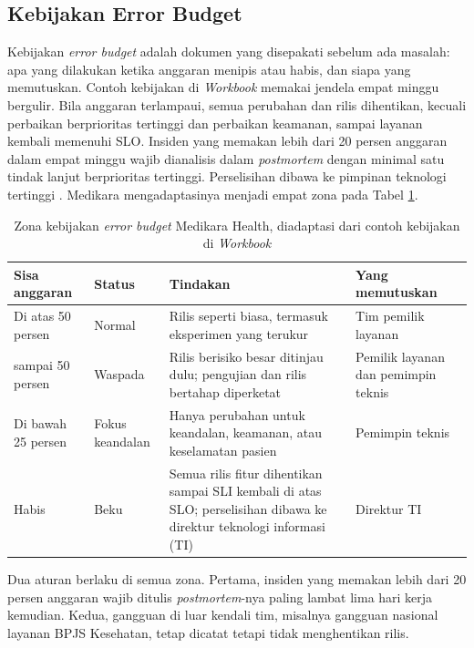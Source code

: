 \subsection{Kebijakan Error Budget}

Kebijakan \textit{error budget} adalah dokumen yang disepakati sebelum ada masalah: apa yang
dilakukan ketika anggaran menipis atau habis, dan siapa yang memutuskan. Contoh kebijakan di
\textit{Workbook} memakai jendela empat minggu bergulir. Bila anggaran terlampaui, semua perubahan
dan rilis dihentikan, kecuali perbaikan berprioritas tertinggi dan perbaikan keamanan, sampai
layanan kembali memenuhi SLO. Insiden yang memakan lebih dari 20 persen anggaran dalam empat minggu
wajib dianalisis dalam \textit{postmortem} dengan minimal satu tindak lanjut berprioritas
tertinggi. Perselisihan dibawa ke pimpinan teknologi tertinggi \cite{c11-sre-workbook}. Medikara
mengadaptasinya menjadi empat zona pada Tabel \ref{tab:ch11-kebijakan-error-budget}.

\begin{table}[!htb]
  \centering
  \caption{Zona kebijakan \textit{error budget} Medikara Health, diadaptasi dari contoh kebijakan
           di \textit{Workbook}}
  \label{tab:ch11-kebijakan-error-budget}
  \footnotesize
  \begin{tabularx}{\textwidth}{>{\raggedright\arraybackslash}p{2.2cm} >{\raggedright\arraybackslash}p{1.8cm} >{\raggedright\arraybackslash}X >{\raggedright\arraybackslash}p{2.4cm}}
    \hline
    \textbf{Sisa anggaran} & \textbf{Status} & \textbf{Tindakan} & \textbf{Yang memutuskan} \\ \hline
    Di atas 50 persen & Normal & Rilis seperti biasa, termasuk eksperimen yang terukur & Tim
      pemilik layanan \\ \hline
    25 sampai 50 persen & Waspada & Rilis berisiko besar ditinjau dulu; pengujian dan rilis
      bertahap diperketat & Pemilik layanan dan pemimpin teknis \\ \hline
    Di bawah 25 persen & Fokus keandalan & Hanya perubahan untuk keandalan, keamanan, atau
      keselamatan pasien & Pemimpin teknis \\ \hline
    Habis & Beku & Semua rilis fitur dihentikan sampai SLI kembali di atas SLO; perselisihan
      dibawa ke direktur teknologi informasi (TI) & Direktur TI \\ \hline
  \end{tabularx}
\end{table}

Dua aturan berlaku di semua zona. Pertama, insiden yang memakan lebih dari 20 persen anggaran
wajib ditulis \textit{postmortem}-nya paling lambat lima hari kerja kemudian. Kedua, gangguan di
luar kendali tim, misalnya gangguan nasional layanan BPJS Kesehatan, tetap dicatat tetapi tidak
menghentikan rilis.

